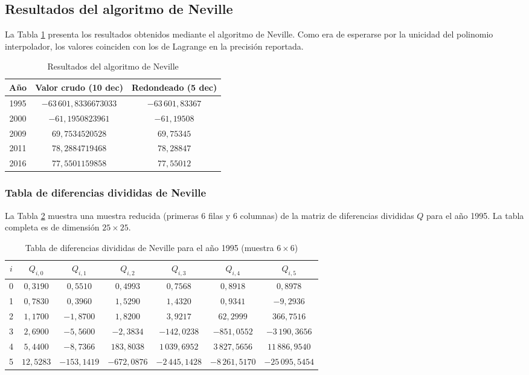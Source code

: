 \documentclass[12pt, letterpaper]{article}
\begin{document}
\subsection{Resultados del algoritmo de Neville}\label{subsec:res-neville}

La Tabla \ref{tab:neville} presenta los resultados obtenidos mediante el algoritmo de Neville. Como era de esperarse por la unicidad del polinomio interpolador, los valores coinciden con los de Lagrange en la precisión reportada.

\begin{table}[H]
\centering
\caption{Resultados del algoritmo de Neville}
\label{tab:neville}
\begin{tabular}{@{}cc>{\bfseries}c@{}}
\toprule
\textbf{Año} & \textbf{Valor crudo (10 dec)} & \textbf{Redondeado (5 dec)} \\
\midrule
1995 & $-63\,601{,}8336673033$ & $-63\,601{,}83367$ \\
2000 & $-61{,}1950823961$ & $-61{,}19508$ \\
2009 & $69{,}7534520528$ & $69{,}75345$ \\
2011 & $78{,}2884719468$ & $78{,}28847$ \\
2016 & $77{,}5501159858$ & $77{,}55012$ \\
\bottomrule
\end{tabular}
\end{table}

\subsubsection{Tabla de diferencias divididas de Neville}

La Tabla \ref{tab:qtable} muestra una muestra reducida (primeras 6 filas y 6 columnas) de la matriz de diferencias divididas $Q$ para el año 1995. La tabla completa es de dimensión $25 \times 25$.

\begin{table}[H]
\centering
\caption{Tabla de diferencias divididas de Neville para el año 1995 (muestra $6 \times 6$)}
\label{tab:qtable}
\small
\begin{tabular}{c|cccccc}
\toprule
$i$ & $Q_{i,0}$ & $Q_{i,1}$ & $Q_{i,2}$ & $Q_{i,3}$ & $Q_{i,4}$ & $Q_{i,5}$ \\
\midrule
0 & $0{,}3190$ & $0{,}5510$ & $0{,}4993$ & $0{,}7568$ & $0{,}8918$ & $0{,}8978$ \\
1 & $0{,}7830$ & $0{,}3960$ & $1{,}5290$ & $1{,}4320$ & $0{,}9341$ & $-9{,}2936$ \\
2 & $1{,}1700$ & $-1{,}8700$ & $1{,}8200$ & $3{,}9217$ & $62{,}2999$ & $366{,}7516$ \\
3 & $2{,}6900$ & $-5{,}5600$ & $-2{,}3834$ & $-142{,}0238$ & $-851{,}0552$ & $-3\,190{,}3656$ \\
4 & $5{,}4400$ & $-8{,}7366$ & $183{,}8038$ & $1\,039{,}6952$ & $3\,827{,}5656$ & $11\,886{,}9540$ \\
5 & $12{,}5283$ & $-153{,}1419$ & $-672{,}0876$ & $-2\,445{,}1428$ & $-8\,261{,}5170$ & $-25\,095{,}5454$ \\
\bottomrule
\end{tabular}
\end{table}
\end{document}
